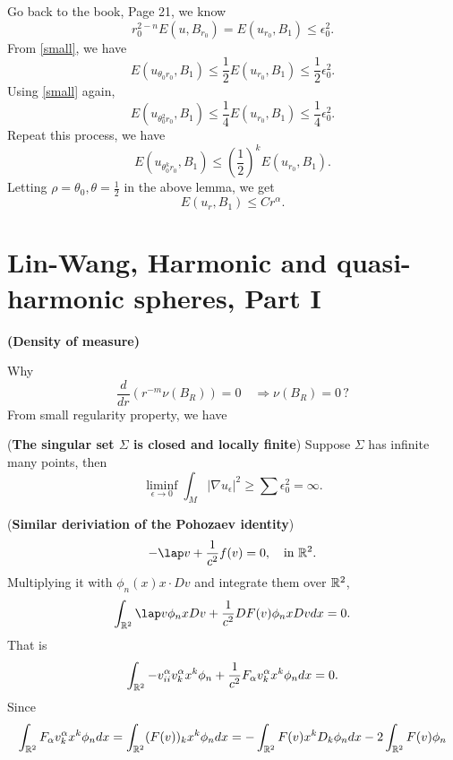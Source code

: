 \documentclass[a4paper,12pt]{article}
\begin{document}
Go back to the book, Page 21, we know 
$$ r_0^{2-n}E(u,B_{r_0})=E(u_{r_0},B_1) \leq \epsilon _0^2 .$$
From \eqref{small}, we have 
$$  E(u_{\theta _0 r_0},B_1) \leq \frac{1}{2} E(u_{r_0},B_1) \leq \frac{1}{2} \epsilon _0^2. $$
Using \eqref{small} again, 
$$  E(u_{\theta _0^2 r_0},B_1) \leq \frac{1}{4} E(u_{ r_0},B_1) \leq \frac{1}{4} \epsilon _0^2. $$
Repeat this process, we have
$$  E(u_{\theta _0^k r_0},B_1) \leq \left(\frac{1}{2}\right)^k E(u_{ r_0},B_1) . $$
Letting $\rho =\theta _0, \theta =\frac{1}{2} $ in the above lemma, we get 
$$ E(u_r,B_1) \leq Cr^{\alpha }. $$ 







\section{Lin-Wang, Harmonic and quasi-harmonic spheres, Part I}

\np \textbf{(Density of measure)}

\np
Why  
$$ \frac{d}{dr}(r^{-m}\nu(B_R))=0  \quad \Rightarrow \nu(B_R)=0 \,?$$
From small regularity property, we have 
$$  $$




\np (\textbf{The singular set $\Sigma $  is closed and locally finite})
Suppose $\Sigma $ has infinite many points, then 
$$ \liminf_{\epsilon \to 0} \int_{M}^{}|\nabla u_{\epsilon }|^2 \geq \sum_{}^{} \epsilon _0^2=\infty .$$ 

\np (\textbf{Similar deriviation of the Pohozaev identity})
$$ -\lap v +\frac{1}{c^2} f(v)=0, \quad \text{in } \rr^2. $$
Multiplying it with $\phi _n(x) x \cdot  Dv$ and integrate them over ${\mathbb R}^2$, 
$$ \int_{\rr^2}^{} \lap v \phi _n x Dv +\frac{1}{c^2} D F(v)\phi _n x Dv dx =0. $$
That is 
$$ \int_{{\mathbb R}^2}- v_{ii}^{\alpha }v_{k}^{\alpha }x^k\phi_n+\frac{1}{c^2} F_{\alpha } v_{k}^{\alpha }x^k\phi _n dx =0.$$
Since 
$$ \int_{{\mathbb R}^2}^{} F_{\alpha } v_{k}^{\alpha }x^k\phi _n dx=\int_{{\mathbb R}^2}^{} (F(v))_kx^k\phi _n dx=-\int_{{\mathbb R}^2} F(v) x^kD_k \phi _n dx -2 \int_{{\mathbb R}^2}^{}F(v)\phi _n $$
\end{document}
